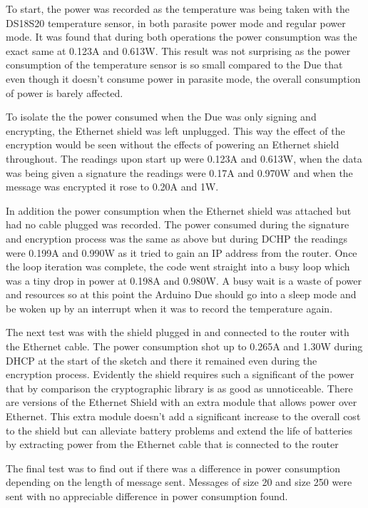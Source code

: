 To start, the power was recorded as the temperature was being taken with the DS18S20 temperature sensor, in both parasite power mode and regular power mode. It was found that during both operations the power consumption was the exact same at 0.123A and 0.613W. This result was not surprising as the power consumption of the temperature sensor is so small compared to the Due that even though it doesn't consume power in parasite mode, the overall consumption of power is barely affected.

To isolate the the power consumed when the Due was only signing and encrypting, the Ethernet shield was left unplugged. This way the effect of the encryption would be seen without the effects of powering an Ethernet shield throughout. 
The readings upon start up were 0.123A and 0.613W, when the data was being given a signature the readings were 0.17A and 0.970W and when the message was encrypted it rose to 0.20A and 1W. 

In addition the power consumption when the Ethernet shield was attached but had no cable plugged was recorded. The power consumed during the signature and encryption process was the same as above but during DCHP the readings were 0.199A and 0.990W as it tried to gain an IP address from the router. Once the loop iteration was complete, the code went straight into a busy loop which was a tiny drop in power at 0.198A and 0.980W. A busy wait is a waste of power and resources so at this point the Arduino Due should go into a sleep mode and be woken up by an interrupt when it was to record the temperature again. 

The next test was with the shield plugged in and connected to the router with the Ethernet cable. The power consumption shot up to 0.265A and 1.30W during DHCP at the start of the sketch and there it remained even during the encryption process. Evidently the shield requires such a significant of the power that by comparison the cryptographic library is as good as unnoticeable. There are versions of the Ethernet Shield with an extra module that allows power over Ethernet. This extra module doesn't add a significant increase to the overall cost to the shield but can alleviate battery problems and extend the life of batteries by extracting power from the Ethernet cable that is connected to the router

The final test was to find out if there was a difference in power consumption depending on the length of message sent. Messages of size 20 and size 250 were sent with no appreciable difference in power consumption found.


